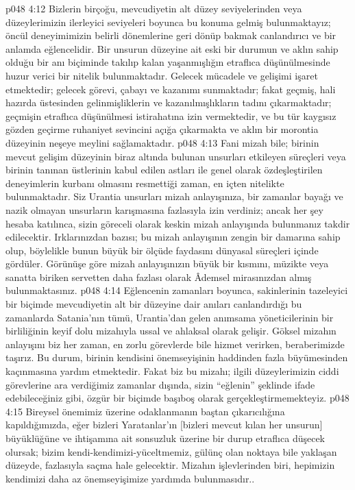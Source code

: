 \vs p048 4:12 Bizlerin birçoğu, mevcudiyetin alt düzey seviyelerinden veya düzeylerimizin ilerleyici seviyeleri boyunca bu konuma gelmiş bulunmaktayız; öncül deneyimimizin belirli dönemlerine geri dönüp bakmak canlandırıcı ve bir anlamda eğlencelidir. Bir unsurun düzeyine ait eski bir durumun ve aklın sahip olduğu bir anı biçiminde takılıp kalan yaşanmışlığın etraflıca düşünülmesinde huzur verici bir nitelik bulunmaktadır. Gelecek mücadele ve gelişimi işaret etmektedir; gelecek görevi, çabayı ve kazanımı sunmaktadır; fakat geçmiş, hali hazırda üstesinden gelinmişliklerin ve kazanılmışlıkların tadını çıkarmaktadır; geçmişin etraflıca düşünülmesi istirahatına izin vermektedir, ve bu tür kaygısız gözden geçirme ruhaniyet sevincini açığa çıkarmakta ve aklın bir morontia düzeyinin neşeye meylini sağlamaktadır.
\vs p048 4:13 Fani mizah bile; birinin mevcut gelişim düzeyinin biraz altında bulunan unsurları etkileyen süreçleri veya birinin tanınan üstlerinin kabul edilen astları ile genel olarak özdeşleştirilen deneyimlerin kurbanı olmasını resmettiği zaman, en içten nitelikte bulunmaktadır. Siz Urantia unsurları mizah anlayışınıza, bir zamanlar bayağı ve nazik olmayan unsurların karışmasına fazlasıyla izin verdiniz; ancak her şey hesaba katılınca, sizin göreceli olarak keskin mizah anlayışında bulunmanız takdir edilecektir. Irklarınızdan bazısı; bu mizah anlayışının zengin bir damarına sahip olup, böylelikle bunun büyük bir ölçüde faydasını dünyasal süreçleri içinde gördüler. Görünüşe göre mizah anlayışınızın büyük bir kısmını, müzikte veya sanatta biriken servetten daha fazlası olarak Âdemsel mirasınızdan almış bulunmaktasınız.
\vs p048 4:14 Eğlencenin zamanları boyunca, sakinlerinin tazeleyici bir biçimde mevcudiyetin alt bir düzeyine dair anıları canlandırdığı bu zamanlarda Satania’nın tümü, Urantia’dan gelen anımsama yöneticilerinin bir birliliğinin keyif dolu mizahıyla ussal ve ahlaksal olarak gelişir. Göksel mizahın anlayışını biz her zaman, en zorlu görevlerde bile hizmet verirken, beraberimizde taşırız. Bu durum, birinin kendisini önemseyişinin haddinden fazla büyümesinden kaçınmasına yardım etmektedir. Fakat biz bu mizahı; ilgili düzeylerimizin ciddi görevlerine ara verdiğimiz zamanlar dışında, sizin “eğlenin” şeklinde ifade edebileceğiniz gibi, özgür bir biçimde başıboş olarak gerçekleştirmemekteyiz.
\vs p048 4:15 Bireysel önemimiz üzerine odaklanmanın baştan çıkarıcılığına kapıldığımızda, eğer bizleri Yaratanlar’ın [bizleri mevcut kılan her unsurun] büyüklüğüne ve ihtişamına ait sonsuzluk üzerine bir durup etraflıca düşecek olursak; bizim kendi\hyp{}kendimizi\hyp{}yüceltmemiz, gülünç olan noktaya bile yaklaşan düzeyde, fazlasıyla saçma hale gelecektir. Mizahın işlevlerinden biri, hepimizin kendimizi daha az önemseyişimize yardımda bulunmasıdır..
